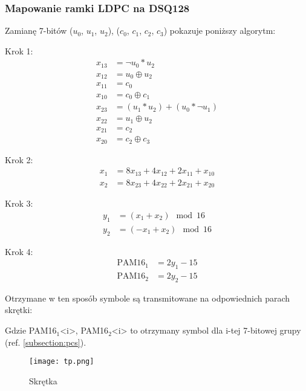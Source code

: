 \subsubsection{Mapowanie ramki LDPC na DSQ128}\label{mapowanie}
Zamianę 7-bitów ($u_0$, $u_1$, $u_2$), ($c_0$, $c_1$, $c_2$, $c_3$) pokazuje poniższy algorytm:

Krok 1:
\begin{align*}
    x_{13} &= \neg u_0 * u_2 \\
    x_{12} &= u_0 \oplus u_2 \\
    x_{11} &= c_0 \\
    x_{10} &= c_0 \oplus c_1 \\
    x_{23} &= (u_1 * u_2) + (u_0 * \neg u_1) \\
    x_{22} &= u_1 \oplus u_2 \\
    x_{21} &= c_2 \\
    x_{20} &= c_2 \oplus c_3
\end{align*}

Krok 2:
\begin{align*}
    x_1 &= 8x_{13} + 4x_{12} + 2x_{11} + x_{10} \\
    x_2 &= 8x_{23} + 4x_{22} + 2x_{21} + x_{20}
\end{align*}

Krok 3:
\begin{align*}
    y_1 &= (x_1 + x_2) \mod 16 \\
    y_2 &= (-x_1 + x_2) \mod 16
\end{align*}

Krok 4:
\begin{align*}
    \text{PAM16}_1 &= 2y_1 - 15 \\
    \text{PAM16}_2 &= 2y_2 - 15
\end{align*}

Otrzymane w ten sposób symbole są transmitowane na odpowiednich parach skrętki:

\begin{table}[h]
    \centering
\end{table}

Gdzie PAM16$_1$<i>, PAM16$_2$<i> to otrzymany symbol dla i-tej 7-bitowej grupy (ref. \ref{subsection:pcs}).

\begin{figure}[ht]
    \centering
    \texttt{[image: tp.png]}
    \caption{Skrętka}
    \label{fig:skretka-zdj}
\end{figure}
